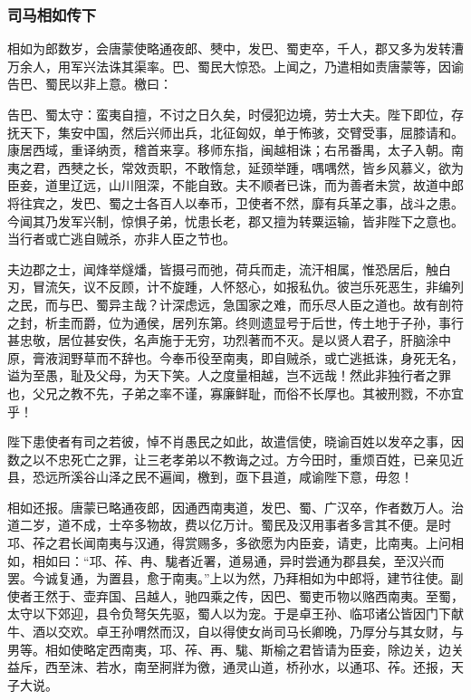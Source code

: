 \documentclass[]{article}
\begin{document}
\hypertarget{header-n4569}{%
\subsubsection{司马相如传下}\label{header-n4569}}

相如为郎数岁，会唐蒙使略通夜郎、僰中，发巴、蜀吏卒，千人，郡又多为发转漕万余人，用军兴法诛其渠率。巴、蜀民大惊恐。上闻之，乃遣相如责唐蒙等，因谕告巴、蜀民以非上意。檄曰：

告巴、蜀太守：蛮夷自擅，不讨之日久矣，时侵犯边境，劳士大夫。陛下即位，存抚天下，集安中国，然后兴师出兵，北征匈奴，单于怖骇，交臂受事，屈膝请和。康居西域，重译纳贡，稽首来享。移师东指，闽越相诛；右吊番禺，太子入朝。南夷之君，西僰之长，常效贡职，不敢惰怠，延颈举踵，喁喁然，皆乡风慕义，欲为臣妾，道里辽远，山川阻深，不能自致。夫不顺者已诛，而为善者未赏，故道中郎将往宾之，发巴、蜀之士各百人以奉币，卫使者不然，靡有兵革之事，战斗之患。今闻其乃发军兴制，惊惧子弟，忧患长老，郡又擅为转粟运输，皆非陛下之意也。当行者或亡逃自贼杀，亦非人臣之节也。

夫边郡之士，闻烽举燧燔，皆摄弓而弛，荷兵而走，流汗相属，惟恐居后，触白刃，冒流矢，议不反顾，计不旋踵，人怀怒心，如报私仇。彼岂乐死恶生，非编列之民，而与巴、蜀异主哉？计深虑远，急国家之难，而乐尽人臣之道也。故有剖符之封，析圭而爵，位为通侯，居列东第。终则遗显号于后世，传土地于子孙，事行甚忠敬，居位甚安佚，名声施于无穷，功烈著而不灭。是以贤人君子，肝脑涂中原，膏液润野草而不辞也。今奉币役至南夷，即自贼杀，或亡逃抵诛，身死无名，谥为至愚，耻及父母，为天下笑。人之度量相越，岂不远哉！然此非独行者之罪也，父兄之教不先，子弟之率不谨，寡廉鲜耻，而俗不长厚也。其被刑戮，不亦宜乎！

陛下患使者有司之若彼，悼不肖愚民之如此，故遣信使，晓谕百姓以发卒之事，因数之以不忠死亡之罪，让三老孝弟以不教诲之过。方今田时，重烦百姓，已亲见近县，恐远所溪谷山泽之民不遍闻，檄到，亟下县道，咸谕陛下意，毋忽！

相如还报。唐蒙已略通夜郎，因通西南夷道，发巴、蜀、广汉卒，作者数万人。治道二岁，道不成，士卒多物故，费以亿万计。蜀民及汉用事者多言其不便。是时邛、莋之君长闻南夷与汉通，得赏赐多，多欲愿为内臣妾，请吏，比南夷。上问相如，相如曰：``邛、莋、冉、駹者近署，道易通，异时尝通为郡县矣，至汉兴而罢。今诚复通，为置县，愈于南夷。''上以为然，乃拜相如为中郎将，建节往使。副使者王然于、壶弃国、吕越人，驰四乘之传，因巴、蜀吏币物以赂西南夷。至蜀，太守以下郊迎，县令负弩矢先驱，蜀人以为宠。于是卓王孙、临邛诸公皆因门下献牛、酒以交欢。卓王孙喟然而汉，自以得使女尚司马长卿晚，乃厚分与其女财，与男等。相如使略定西南夷，邛、莋、再、駹、斯榆之君皆请为臣妾，除边关，边关益斥，西至沫、若水，南至牁牂为徼，通灵山道，桥孙水，以通邛、莋。还报，天子大说。
\end{document}
